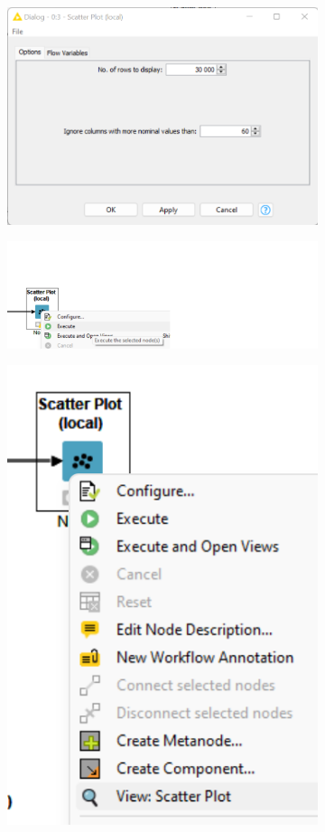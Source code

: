 \documentclass[11pt]{report}
\begin{document}
\begin{figure}
    \centering
    \begin{subfigure}{.3\textwidth}
        \centering
        \includegraphics[width=0.9\linewidth]{scatter_plot_2.png}
    \end{subfigure}%
    \begin{subfigure}{.3\textwidth}
        \centering
        \includegraphics[width=1.0\linewidth]{scatter_plot_3.png}
    \end{subfigure}
    \begin{subfigure}{.3\textwidth}
        \centering
        \includegraphics[width=.6\linewidth]{scatter_plot_4.png}

\end{subfigure}
\end{figure}
\end{document}
